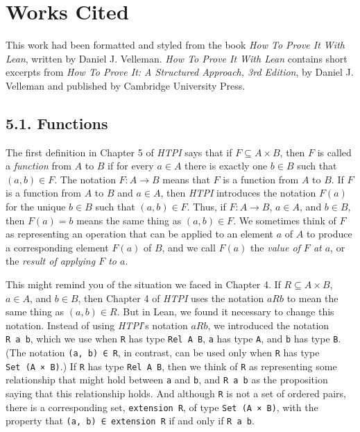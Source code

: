 \documentclass[
  letterpaper,
  DIV=11,
  numbers=noendperiod]{scrreprt}
\theoremstyle{remark}
\begin{document}

\hypertarget{works-cited}{%
\chapter{Works Cited}\label{works-cited}}

This work had been formatted and styled from the book \emph{How To Prove
It With Lean}, written by Daniel J. Velleman. \emph{How To Prove It With
Lean} contains short excerpts from \emph{How To Prove It: A Structured
Approach, 3rd Edition}, by Daniel J. Velleman and published by Cambridge
University Press.

\hypertarget{functions}{%
\section{5.1. Functions}\label{functions}}

The first definition in Chapter 5 of \emph{HTPI} says that if
\(F \subseteq A \times B\), then \(F\) is called a \emph{function} from
\(A\) to \(B\) if for every \(a \in A\) there is exactly one \(b \in B\)
such that \((a, b) \in F\). The notation \(F : A \to B\) means that
\(F\) is a function from \(A\) to \(B\). If \(F\) is a function from
\(A\) to \(B\) and \(a \in A\), then \emph{HTPI} introduces the notation
\(F(a)\) for the unique \(b \in B\) such that \((a, b) \in F\). Thus, if
\(F : A \to B\), \(a \in A\), and \(b \in B\), then \(F(a) = b\) means
the same thing as \((a, b) \in F\). We sometimes think of \(F\) as
representing an operation that can be applied to an element \(a\) of
\(A\) to produce a corresponding element \(F(a)\) of \(B\), and we call
\(F(a)\) the \emph{value of \(F\) at \(a\)}, or the \emph{result of
applying \(F\) to \(a\)}.

This might remind you of the situation we faced in Chapter 4. If
\(R \subseteq A \times B\), \(a \in A\), and \(b \in B\), then Chapter 4
of \emph{HTPI} uses the notation \(aRb\) to mean the same thing as
\((a, b) \in R\). But in Lean, we found it necessary to change this
notation. Instead of using \emph{HTPI}'s notation \(aRb\), we introduced
the notation \texttt{R\ a\ b}, which we use when \texttt{R} has type
\texttt{Rel\ A\ B}, \texttt{a} has type \texttt{A}, and \texttt{b} has
type \texttt{B}. (The notation \texttt{(a,\ b)\ ∈\ R}, in contrast, can
be used only when \texttt{R} has type \texttt{Set\ (A\ ×\ B)}.) If
\texttt{R} has type \texttt{Rel\ A\ B}, then we think of \texttt{R} as
representing some relationship that might hold between \texttt{a} and
\texttt{b}, and \texttt{R\ a\ b} as the proposition saying that this
relationship holds. And although \texttt{R} is not a set of ordered
pairs, there is a corresponding set, \texttt{extension\ R}, of type
\texttt{Set\ (A\ ×\ B)}, with the property that
\texttt{(a,\ b)\ ∈\ extension\ R} if and only if \texttt{R\ a\ b}.
\end{document}
